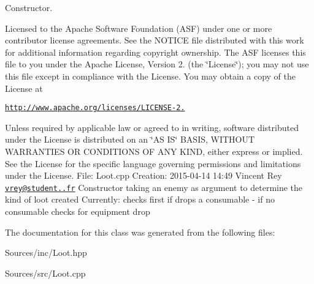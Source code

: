 Constructor. 

Licensed to the Apache Software Foundation (A\+S\+F) under one or more contributor license agreements. See the N\+O\+T\+I\+C\+E file distributed with this work for additional information regarding copyright ownership. The A\+S\+F licenses this file to you under the Apache License, Version 2. (the \char`\"{}\+License\char`\"{}); you may not use this file except in compliance with the License. You may obtain a copy of the License at

\href{http://www.apache.org/licenses/LICENSE-2.0}{\tt http\+://www.\+apache.\+org/licenses/\+L\+I\+C\+E\+N\+S\+E-\/2.}

Unless required by applicable law or agreed to in writing, software distributed under the License is distributed on an \char`\"{}\+A\+S I\+S\char`\"{} B\+A\+S\+I\+S, W\+I\+T\+H\+O\+U\+T W\+A\+R\+R\+A\+N\+T\+I\+E\+S O\+R C\+O\+N\+D\+I\+T\+I\+O\+N\+S O\+F A\+N\+Y K\+I\+N\+D, either express or implied. See the License for the specific language governing permissions and limitations under the License. File\+: Loot.\+cpp Creation\+: 2015-\/04-\/14 14\+:49 Vincent Rey \href{mailto:vrey@student.42.fr}{\tt vrey@student..\+fr} Constructor taking an enemy as argument to determine the kind of loot created Currently\+: checks first if drops a consumable -\/ if no consumable checks for equipment drop 

The documentation for this class was generated from the following files\+:\begin{DoxyCompactItemize}
\item 
Sources/inc/Loot.\+hpp\item 
Sources/src/Loot.\+cpp\end{DoxyCompactItemize}
